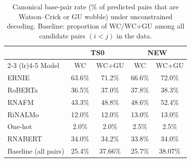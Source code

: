 \begin{table}[t]
\centering
\caption{Canonical base-pair rate (\% of predicted pairs that are Watson--Crick or GU wobble) under unconstrained decoding. Baseline: proportion of WC/WC+GU among all candidate pairs $(i<j)$ in the data.}
\label{tab:canonical_ts_new}
\begin{tabular}{lcccc}
\toprule
& \multicolumn{2}{c}{TS0} & \multicolumn{2}{c}{NEW} \\
\cmidrule(lr){2-3} \cmidrule(lr){4-5}
Model & WC & WC+GU & WC & WC+GU \\
\midrule
ERNIE & 63.6\% & 71.2\% & 66.6\% & 72.0\% \\
RoBERTa & 36.5\% & 37.0\% & 37.8\% & 38.3\% \\
RNAFM & 43.3\% & 48.8\% & 48.6\% & 52.4\% \\
RiNALMo & 12.0\% & 12.0\% & 13.0\% & 13.0\% \\
One-hot & 2.0\% & 2.0\% & 2.5\% & 2.5\% \\
RNABERT & 34.0\% & 34.2\% & 33.8\% & 34.0\% \\
Baseline (all pairs) & 25.4\% & 37.66\% & 25.7\% & 38.07\% \\
\bottomrule
\end{tabular}
\end{table}
